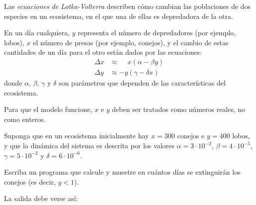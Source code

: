 Las \emph{ecuaciones de Lotka-Volterra}
describen cómo cambian las poblaciones de dos especies en un ecosistema,
en el que una de ellas es depredadora de la otra.

En un día cualquiera,
\(y\) representa el número de depredadores (por ejemplo, lobos),
\(x\) el número de presas (por ejemplo, conejos),
y el cambio de estas cantidades de un día para el otro
están dados por las ecuaciones:
\begin{align*}
  \Delta x &\approx \phantom{-}x(\alpha - \beta  y) \\
  \Delta y &\approx           -y(\gamma - \delta x)
\end{align*}
donde \(\alpha\), \(\beta\), \(\gamma\) y \(\delta\)
son parámetros que dependen de las características del ecosistema.

Para que el modelo funcione,
\(x\) e \(y\) deben ser tratados como números reales,
no como enteros.

Suponga que en un ecosistema inicialmente hay
\(x = 300\) conejos e \(y = 400\) lobos,
y que la dinámica del sistema es descrita por los valores
\(\alpha = 3\cdot 10^{-2}\),
\(\beta  = 4\cdot 10^{-5}\),
\(\gamma = 5\cdot 10^{-2}\) y
\(\delta = 6\cdot 10^{-6}\).

Escriba un programa que calcule y muestre
en cuántos días se extinguirán los conejos
(es decir, \(y < 1\)).

La salida debe verse así:

\begin{minipage}[t]{.60\textwidth}
  
\end{minipage}


